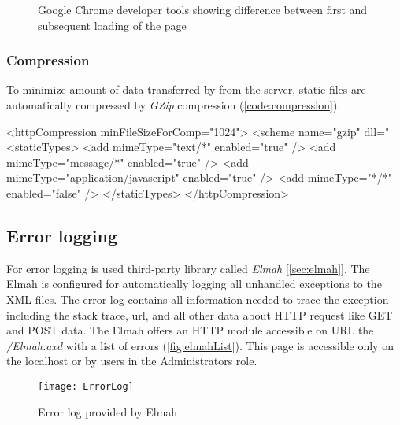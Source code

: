 \begin{figure}[h!]
	\hfill
	\caption{Google Chrome developer tools showing difference between first and subsequent loading of the page}
	\label{fig:cacheDt}
\end{figure}


\subsubsection{Compression}

To minimize amount of data transferred by from the server, static files are automatically compressed by \emph{GZip} compression (\autoref{code:compression}).

\begin{XML}[label=code:compression,caption={Compression part of the \emph{Web.config}}]
<httpCompression minFileSizeForComp="1024">
<scheme name="gzip" dll="%
	<staticTypes>
		<add mimeType="text/*" enabled="true" />
		<add mimeType="message/*" enabled="true" />
		<add mimeType="application/javascript" enabled="true" />
		<add mimeType="*/*" enabled="false" />
	</staticTypes>
</httpCompression>
\end{XML}


\subsection{Error logging}
\label{sec:implErrorLog}

For error logging is used third-party library called \emph{Elmah} [\ref{sec:elmah}].
The Elmah is configured for automatically logging all unhandled exceptions to the XML files.
The error log contains all information needed to trace the exception including the stack trace, url, and all other data about HTTP request like GET and POST data.
The Elmah offers an HTTP module accessible on URL the \emph{/Elmah.axd} with a list of errors (\autoref{fig:elmahList}).
This page is accessible only on the localhost or by users in the Administrators role.

\begin{figure}[h!]
	\texttt{[image: ErrorLog]}
	\caption{Error log provided by Elmah}
	\label{fig:elmahList}
\end{figure}

